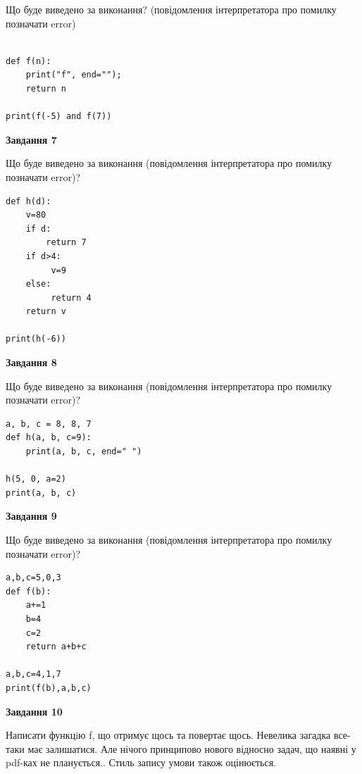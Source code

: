 \documentclass[12pt, ukrainian]{article}
\begin{document}
{\begin {large}
Що буде виведено за виконання? (повідомлення інтерпретатора про помилку позначати error)\par
\begin{verbatim}

def f(n):
    print("f", end="");
    return n

print(f(-5) and f(7))
\end{verbatim}

{\begin {center}\textbf{Завдання 7}\end {center}}

Що буде виведено за виконання (повідомлення інтерпретатора про помилку позначати error)?\par
\begin{verbatim}
def h(d):
    v=80
    if d: 
        return 7
    if d>4:
         v=9
    else:
         return 4
    return v

print(h(-6))
\end{verbatim}

{\begin {center}\textbf{Завдання 8}\end {center}}

Що буде виведено за виконання (повідомлення інтерпретатора про помилку позначати error)?\par
\begin{verbatim}
a, b, c = 8, 8, 7
def h(a, b, c=9):
    print(a, b, c, end=" ")

h(5, 0, a=2)
print(a, b, c)
\end{verbatim}

{\begin {center}\textbf{Завдання 9}\end {center}}

Що буде виведено за виконання (повідомлення інтерпретатора про помилку позначати error)?\par
\begin{verbatim}
a,b,c=5,0,3
def f(b):
    a+=1
    b=4
    c=2
    return a+b+c

a,b,c=4,1,7
print(f(b),a,b,c)
\end{verbatim}

{\begin {center}\textbf{Завдання 10}\end {center}}


Написати функцiю f, що отримує щось та повертає щось. Невелика загадка все-таки має залишатися. Але нічого принципово нового відносно задач, що наявні у pdf-ках не планується.. Стиль запису умови також оцінюється.\par
\end {large}}
\newpage
\end{document}
